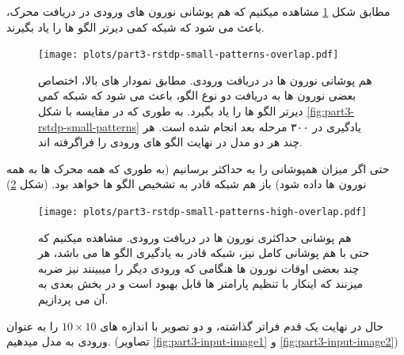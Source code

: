         مطابق شکل 
        \ref{fig:part3-rstdp-small-patterns-overlap}
        مشاهده میکنیم که هم پوشانی نورون های ورودی در دریافت محرک، باعث می شود که شبکه کمی دیرتر الگو ها را یاد بگیرند.
        \begin{figure}[!ht]
            \centering
            \captionsetup{width=.9\linewidth}
            \texttt{[image: plots/part3-rstdp-small-patterns-overlap.pdf]} 
            \caption{هم پوشانی نورون ها در دریافت ورودی. مطابق نمودار های بالا، اختصاص بعضی نورون ها به دریافت دو نوع الگو، باعث می شود که شبکه کمی دیرتر الگو ها را یاد بگیرد. به طوری که در مقایسه با شکل
            \ref{fig:part3-rstdp-small-patterns}
            یادگیری در ۳۰۰ مرحله بعد انجام شده است. هر چند هر دو مدل در نهایت الگو های ورودی را فراگرفته اند.
            }
            \label{fig:part3-rstdp-small-patterns-overlap}
        \end{figure}
        حتی اگر میزان همپوشانی را به حداکثر برسانیم
        (به طوری که همه محرک ها به همه نورون ها داده شود)
        باز هم شبکه قادر به تشخیص الگو ها خواهد بود.
        (شکل \ref{fig:part3-rstdp-small-patterns-high-overlap})

        \begin{figure}[!ht]
            \centering
            \captionsetup{width=.9\linewidth}
            \texttt{[image: plots/part3-rstdp-small-patterns-high-overlap.pdf]} 
            \caption{هم پوشانی حداکثری نورون ها در دریافت ورودی. مشاهده میکنیم که حتی با هم پوشانی کامل نیز، شبکه قادر به یادگیری الگو ها می باشد، هر چند بعضی اوقات نورون ها هنگامی که ورودی دیگر را میبینند نیز ضربه میزنند که اینکار با تنظیم پارامتر ها قابل بهبود است و در بخش بعدی به آن می پردازیم.
            }
            \label{fig:part3-rstdp-small-patterns-high-overlap}
        \end{figure}

        حال در نهایت یک قدم فراتر گذاشته، و دو تصویر با اندازه های 
        $10\times 10$ 
        را به عنوان ورودی به مدل میدهیم.
        (تصاویر 
        \ref{fig:part3-input-image1} و
        \ref{fig:part3-input-image2})

